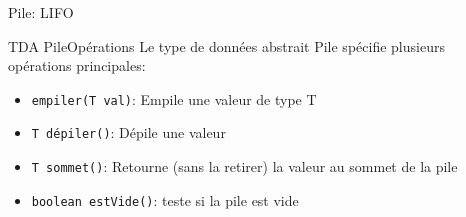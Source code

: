 \documentclass[12pt,a4paper]{beamer}
\begin{document}
\begin{frame}{Pile: LIFO}{}
\end{frame}

\begin{frame}{TDA Pile}{Opérations}
Le type de données abstrait Pile spécifie plusieurs opérations principales:
\begin{itemize}
\item \texttt{empiler(T val)}: Empile une valeur de type T
\item \texttt{T dépiler()}: Dépile une valeur
\item \texttt{T sommet()}: Retourne (sans la retirer) la valeur au sommet de la pile
\item \texttt{boolean estVide()}: teste si la pile est vide
\end{itemize}

\end{frame}
\end{document}
